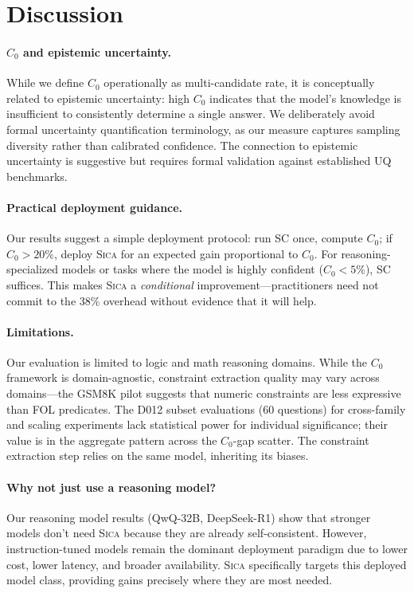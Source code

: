 \documentclass[11pt,a4paper]{article}
\newcommand{\sica}{\textsc{Sica}}
\newcommand{\czero}{C_0}
\begin{document}
\section{Discussion}
\label{sec:discussion}

\paragraph{$\czero{}$ and epistemic uncertainty.}
While we define $\czero{}$ operationally as multi-candidate rate, it is conceptually related to epistemic uncertainty: high $\czero{}$ indicates that the model's knowledge is insufficient to consistently determine a single answer.
We deliberately avoid formal uncertainty quantification terminology, as our measure captures sampling diversity rather than calibrated confidence.
The connection to epistemic uncertainty is suggestive but requires formal validation against established UQ benchmarks.

\paragraph{Practical deployment guidance.}
Our results suggest a simple deployment protocol: run SC once, compute $\czero{}$; if $\czero{}>20\%$, deploy \sica{} for an expected gain proportional to $\czero{}$.
For reasoning-specialized models or tasks where the model is highly confident ($\czero{}<5\%$), SC suffices.
This makes \sica{} a \emph{conditional} improvement---practitioners need not commit to the 38\% overhead without evidence that it will help.

\paragraph{Limitations.}
Our evaluation is limited to logic and math reasoning domains.
While the $\czero{}$ framework is domain-agnostic, constraint extraction quality may vary across domains---the GSM8K pilot suggests that numeric constraints are less expressive than FOL predicates.
The D012 subset evaluations (60 questions) for cross-family and scaling experiments lack statistical power for individual significance; their value is in the aggregate pattern across the $\czero{}$-gap scatter.
The constraint extraction step relies on the same model, inheriting its biases.

\paragraph{Why not just use a reasoning model?}
Our reasoning model results (QwQ-32B, DeepSeek-R1) show that stronger models don't need \sica{} because they are already self-consistent.
However, instruction-tuned models remain the dominant deployment paradigm due to lower cost, lower latency, and broader availability.
\sica{} specifically targets this deployed model class, providing gains precisely where they are most needed.
\end{document}
